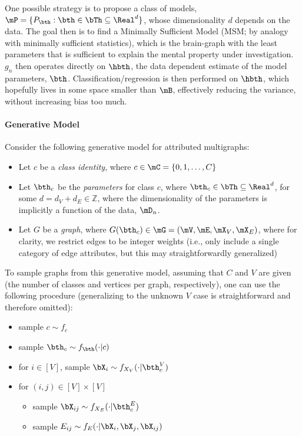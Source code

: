 One possible strategy is to propose a class of models, $\mP=\{P_{\bth} : \bth \in \bTh \subseteq \Real^d\}$, whose dimensionality $d$ depends on the data.  %
The goal then is to find a Minimally Sufficient Model (MSM; by analogy with minimally sufficient statistics), which is the brain-graph with the least parameters that is sufficient to explain the mental property under investigation.  $g_n$ then operates directly on $\hbth$, the data dependent estimate of the model parameters, $\bth$. Classification/regression is then performed on $\hbth$, which hopefully lives in some space smaller than $\mB$, effectively reducing the variance, without increasing bias too much.


\paragraph{Generative Model}

Consider the following generative model for attributed multigraphs:

\begin{itemize}
	\item Let $c$ be a \emph{class identity}, where $c \in \mC=\{0,1,\ldots, C\}$
	\item Let $\bth_c$ be the \emph{parameters} for class $c$, where $\bth_c \in \bTh \subseteq \Real^{d}$, for some $d=d_{V}+d_{E} \in \mathbb{Z}$, where the dimensionality of the parameters is implicitly a function of the data, $\mD_n$.
	\item Let $G$ be a \emph{graph}, where $G(\bth_c) \in \mG=(\mV, \mE, \mX_V, \mX_E)$, where for clarity, we restrict edges to be integer weights (i.e., only include a single category of edge attributes, but this may straightforwardly generalized)%
\end{itemize}

To sample graphs from this generative model, assuming that $C$ and $V$ are given (the number of classes and vertices per graph, respectively), one can use the following procedure (generalizing to the unknown $V$ case is straightforward and therefore omitted):

\begin{itemize}
	\item sample $c \sim f_c$
	\item sample $\bth_c \sim f_{\bth}(\cdot | c)$
	\item for $i \in [V]$, sample $\bX_i \sim f_{X_V}(\cdot | \bth_c^V)$
	\item for $(i,j) \in [V] \times [V]$
	\begin{itemize}
		\item sample $\bX_{ij} \sim f_{X_E}(\cdot | \bth_c^E)$
		\item  sample $E_{ij} \sim f_E(\cdot | \bX_i, \bX_j, \bX_{ij})$
	\end{itemize}
\end{itemize}

